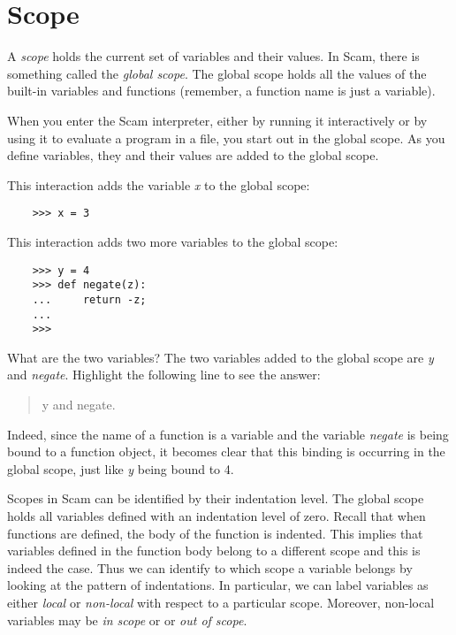 \chapter{Scope}
\label{Scope}

A {\it scope} holds the current set of variables and their values.
In Scam, there is something called the {\it global scope}.
The global scope holds all the values of the built-in variables
and functions (remember, a function name is just a variable).

When you enter the Scam interpreter, either by running it
interactively or by using it to evaluate a program in
a file, you start out in the global scope.
As you define variables, they and their values are added
to the global scope.

This interaction adds the variable {\it x} to the global scope:

\begin{verbatim}
    >>> x = 3
\end{verbatim}

This interaction adds two more variables to the global scope:

\begin{verbatim}
    >>> y = 4
    >>> def negate(z):
    ...     return -z;
    ...
    >>>
\end{verbatim}

What are the two variables?
\T The two variables added to the global scope are {\it y} and {\it negate}.
\W Highlight the following line to see the answer:

\W\begin{quote}
 {\color{white} y and negate.}
\W\end{quote}

Indeed, since the name of a function is a variable and the variable {\it negate}
is being bound to a function object, it becomes clear that
this binding is occurring in the
global scope, just like {\it y} being bound to 4.

Scopes in Scam can be identified by their indentation level.
The global scope holds all variables defined with an indentation
level of zero.
Recall that when functions are defined, the body of the function
is indented. This implies that variables defined in the function body
belong to a different scope and this is indeed the case.
Thus we can identify to which scope a variable belongs by
looking at the pattern of indentations.
In particular,
we can label variables as 
either {\it local} or {\it non-local}
with respect to a particular scope.
Moreover, non-local variables may be {\it in scope} or
or {\it out of scope}.

